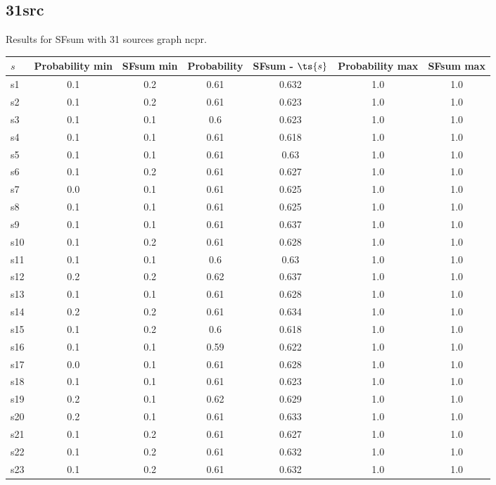 \documentclass{article}
\begin{document}
\newpage

\subsection{31src}

\noindent Results for SFsum with 31 sources graph ncpr.

\noindent\begin{tabular}{|l|c|c|c|c|c|c|}
\hline
$s$& Probability min & SFsum min & Probability & SFsum - $\ts{s}$ & Probability max & SFsum max\\
\hline
s1 &0.1 & 0.2 & 0.61 & 0.632 & 1.0 & 1.0\\
\hline
s2 &0.1 & 0.2 & 0.61 & 0.623 & 1.0 & 1.0\\
\hline
s3 &0.1 & 0.1 & 0.6 & 0.623 & 1.0 & 1.0\\
\hline
s4 &0.1 & 0.1 & 0.61 & 0.618 & 1.0 & 1.0\\
\hline
s5 &0.1 & 0.1 & 0.61 & 0.63 & 1.0 & 1.0\\
\hline
s6 &0.1 & 0.2 & 0.61 & 0.627 & 1.0 & 1.0\\
\hline
s7 &0.0 & 0.1 & 0.61 & 0.625 & 1.0 & 1.0\\
\hline
s8 &0.1 & 0.1 & 0.61 & 0.625 & 1.0 & 1.0\\
\hline
s9 &0.1 & 0.1 & 0.61 & 0.637 & 1.0 & 1.0\\
\hline
s10 &0.1 & 0.2 & 0.61 & 0.628 & 1.0 & 1.0\\
\hline
s11 &0.1 & 0.1 & 0.6 & 0.63 & 1.0 & 1.0\\
\hline
s12 &0.2 & 0.2 & 0.62 & 0.637 & 1.0 & 1.0\\
\hline
s13 &0.1 & 0.1 & 0.61 & 0.628 & 1.0 & 1.0\\
\hline
s14 &0.2 & 0.2 & 0.61 & 0.634 & 1.0 & 1.0\\
\hline
s15 &0.1 & 0.2 & 0.6 & 0.618 & 1.0 & 1.0\\
\hline
s16 &0.1 & 0.1 & 0.59 & 0.622 & 1.0 & 1.0\\
\hline
s17 &0.0 & 0.1 & 0.61 & 0.628 & 1.0 & 1.0\\
\hline
s18 &0.1 & 0.1 & 0.61 & 0.623 & 1.0 & 1.0\\
\hline
s19 &0.2 & 0.1 & 0.62 & 0.629 & 1.0 & 1.0\\
\hline
s20 &0.2 & 0.1 & 0.61 & 0.633 & 1.0 & 1.0\\
\hline
s21 &0.1 & 0.2 & 0.61 & 0.627 & 1.0 & 1.0\\
\hline
s22 &0.1 & 0.2 & 0.61 & 0.632 & 1.0 & 1.0\\
\hline
s23 &0.1 & 0.2 & 0.61 & 0.632 & 1.0 & 1.0\\

\end{tabular}
\end{document}
